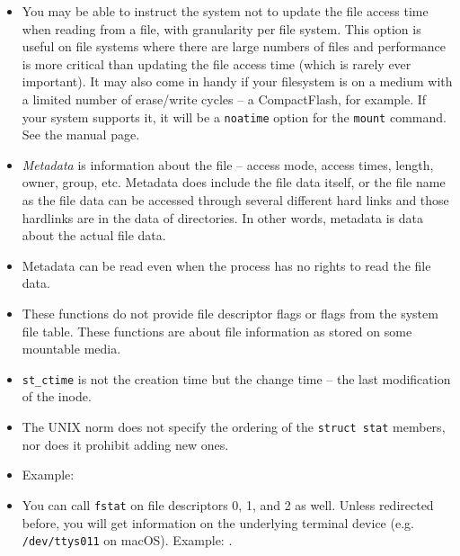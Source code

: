 \begin{itemize}
\item You may be able to instruct the system not to update the file access time
when reading from a file, with granularity per file system.  This option is
useful on file systems where there are large numbers of files and performance is
more critical than updating the file access time (which is rarely ever
important).  It may also come in handy if your filesystem is on a medium with a
limited number of erase/write cycles -- a CompactFlash, for example.  If your
system supports it, it will be a \texttt{noatime} option for the \texttt{mount}
command.  See the manual page.
\item \emph{Metadata} is information about the file -- access mode, access
times, length, owner, group, etc.  Metadata does  include the file
data itself, or the file name as the file data can be accessed through
several different hard links and those hardlinks are in the data of directories.
In other words, metadata is data about the actual file data.
\item Metadata can be read even when the process has no rights to read the file
data.
\item These functions do not provide file descriptor flags or flags from the
system file table. These functions are about file information as stored on some
mountable media.
\item \texttt{st\_ctime} is not the creation time but the change time -- the
last modification of the inode.
\item The UNIX norm does not specify the ordering of the \texttt{struct stat}
members, nor does it prohibit adding new ones.
\item \label{STAT} Example: 
\item You can call \texttt{fstat} on file descriptors 0, 1, and 2 as well.  Unless
redirected before, you will get information on the underlying terminal device
(e.g. \texttt{/dev/ttys011} on macOS).  Example: .
\end{itemize}




